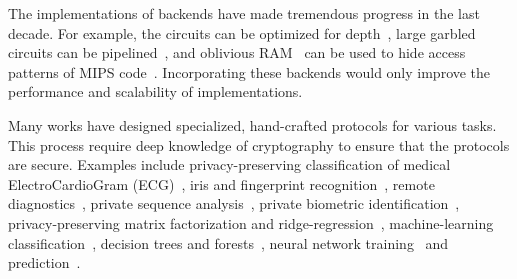 The implementations of \mpc backends  have made  tremendous progress in the last decade.
For example, the circuits can be optimized for depth~\cite{ddkssz15,cbmcgcdepth}, large garbled circuits can be pipelined~\cite{yao-pipe}, and oblivious RAM~\cite{oram1,oram2} can be used to hide access patterns of MIPS code~\cite{mips}. Incorporating these backends would only improve the performance and scalability of \tool implementations.

Many works have designed specialized, hand-crafted protocols for various \mpc tasks. 
This process require deep knowledge of cryptography
to ensure that the protocols are secure.
Examples include privacy-preserving classification of medical ElectroCardioGram (ECG)~\cite{barni}, iris and fingerprint recognition~\cite{blanton}, remote diagnostics~\cite{brickell}, private sequence analysis~\cite{franz}, private biometric identification~\cite{huang}, privacy-preserving matrix factorization and ridge-regression~\cite{valeriaMatrix, valeriaRidge}, machine-learning classification~\cite{shafindss}, decision trees and forests~\cite{wu}, neural network training~\cite{secureml} and prediction~\cite{minionn}.

